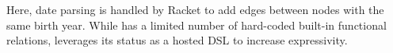 \documentclass[dvipsnames,sigplan,screen,review,anonymous,acmthm,nonacm]{acmart}
\begin{document}
Here, date parsing is handled by Racket to add edges between nodes
with the same birth year. While \Dusa{} has a limited number of
hard-coded built-in functional relations, \miniDusa{} leverages
its status as a hosted DSL to increase expressivity.


\clearpage


\end{document}
